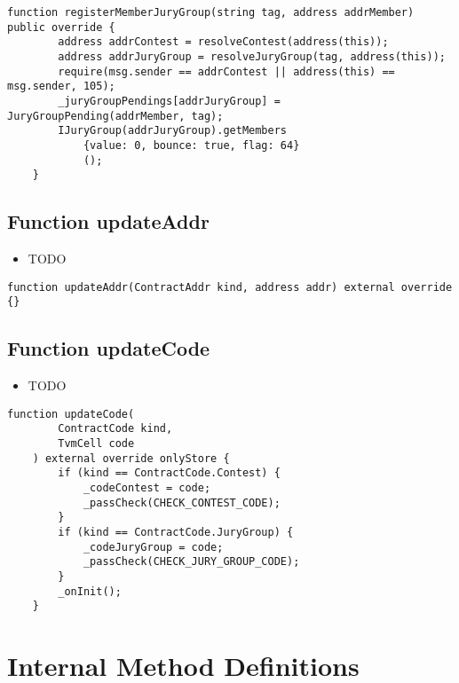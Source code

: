 \begin{lstlisting}[firstnumber=120]
    function registerMemberJuryGroup(string tag, address addrMember) public override {
        address addrContest = resolveContest(address(this));
        address addrJuryGroup = resolveJuryGroup(tag, address(this));
        require(msg.sender == addrContest || address(this) == msg.sender, 105);
        _juryGroupPendings[addrJuryGroup] = JuryGroupPending(addrMember, tag);
        IJuryGroup(addrJuryGroup).getMembers
            {value: 0, bounce: true, flag: 64}
            ();
    }
\end{lstlisting}

\subsection{Function updateAddr}

\begin{itemize}
\item TODO
\end{itemize}

\begin{lstlisting}[firstnumber=77]
    function updateAddr(ContractAddr kind, address addr) external override {}
\end{lstlisting}

\subsection{Function updateCode}

\begin{itemize}
\item TODO
\end{itemize}

\begin{lstlisting}[firstnumber=62]
    function updateCode(
        ContractCode kind,
        TvmCell code
    ) external override onlyStore {
        if (kind == ContractCode.Contest) {
            _codeContest = code;
            _passCheck(CHECK_CONTEST_CODE);
        }
        if (kind == ContractCode.JuryGroup) {
            _codeJuryGroup = code;
            _passCheck(CHECK_JURY_GROUP_CODE);
        }
        _onInit();
    }
\end{lstlisting}

\section{Internal Method Definitions}


